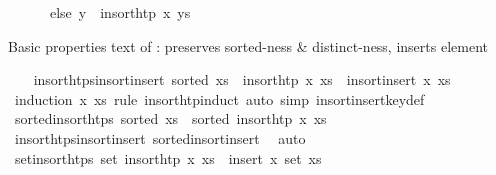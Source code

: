 \begin{isabellebody}
\ \ \ \ \ \ else\ y\ {\isacharhash}{\kern0pt}\ {\isacharparenleft}{\kern0pt}insort{\isacharunderscore}{\kern0pt}htp\ x\ ys{\isacharparenright}{\kern0pt}{\isacharparenright}{\kern0pt}{\isachardoublequoteclose}%
\begin{isamarkuptext}%
Basic properties text of : 
    preserves sorted-ness \& distinct-ness, inserts element%
\end{isamarkuptext}\isamarkuptrue%
\ \ \isamarkupfalse%
\ insort{\isacharunderscore}{\kern0pt}htps{\isacharunderscore}{\kern0pt}insort{\isacharunderscore}{\kern0pt}insert{\isacharcolon}{\kern0pt}\ {\isachardoublequoteopen}sorted\ xs\ {\isasymLongrightarrow}\ insort{\isacharunderscore}{\kern0pt}htp\ x\ xs\ {\isacharequal}{\kern0pt}\ insort{\isacharunderscore}{\kern0pt}insert\ x\ xs{\isachardoublequoteclose}\isanewline
%
\isadelimproof
\ \ \ \ %
\endisadelimproof
%
\isatagproof
{}\isamarkupfalse%
\ {\isacharparenleft}{\kern0pt}induction\ x\ xs\ rule{\isacharcolon}{\kern0pt}\ insort{\isacharunderscore}{\kern0pt}htp{\isachardot}{\kern0pt}induct{\isacharparenright}{\kern0pt}\ {\isacharparenleft}{\kern0pt}auto\ simp{\isacharcolon}{\kern0pt}\ insort{\isacharunderscore}{\kern0pt}insert{\isacharunderscore}{\kern0pt}key{\isacharunderscore}{\kern0pt}def{\isacharparenright}{\kern0pt}%
\endisatagproof
{\isafoldproof}%
%
\isadelimproof
\isanewline
%
\endisadelimproof
\isanewline
\ \ \isamarkupfalse%
\ sorted{\isacharunderscore}{\kern0pt}insort{\isacharunderscore}{\kern0pt}htps{\isacharcolon}{\kern0pt}\ {\isachardoublequoteopen}sorted\ xs\ {\isasymLongrightarrow}\ sorted\ {\isacharparenleft}{\kern0pt}insort{\isacharunderscore}{\kern0pt}htp\ x\ xs{\isacharparenright}{\kern0pt}{\isachardoublequoteclose}\isanewline
%
\isadelimproof
\ \ \ \ %
\endisadelimproof
%
\isatagproof
{}\isamarkupfalse%
\ insort{\isacharunderscore}{\kern0pt}htps{\isacharunderscore}{\kern0pt}insort{\isacharunderscore}{\kern0pt}insert\ sorted{\isacharunderscore}{\kern0pt}insort{\isacharunderscore}{\kern0pt}insert\ \isamarkupfalse%
\ auto%
\endisatagproof
{\isafoldproof}%
%
\isadelimproof
\isanewline
%
\endisadelimproof
\isanewline
\ \ \isamarkupfalse%
\ set{\isacharunderscore}{\kern0pt}insort{\isacharunderscore}{\kern0pt}htps{\isacharcolon}{\kern0pt}\ {\isachardoublequoteopen}set\ {\isacharparenleft}{\kern0pt}insort{\isacharunderscore}{\kern0pt}htp\ x\ xs{\isacharparenright}{\kern0pt}\ {\isacharequal}{\kern0pt}\ insert\ x\ {\isacharparenleft}{\kern0pt}set\ xs{\isacharparenright}{\kern0pt}{\isachardoublequoteclose}\isanewline

\end{isabellebody}
